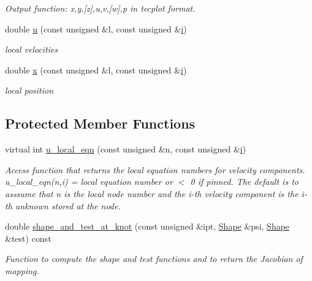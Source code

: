 \begin{DoxyCompactItemize}
\begin{DoxyCompactList}\small\item\em Output function\+: x,y,\mbox{[}z\mbox{]},u,v,\mbox{[}w\mbox{]},p in tecplot format. \end{DoxyCompactList}\item 
double \hyperlink{classoomph_1_1PolarStressIntegralElement_a2440239bc1944834403dc8a898c71672}{u} (const unsigned \&l, const unsigned \&\hyperlink{cfortran_8h_adb50e893b86b3e55e751a42eab3cba82}{i})
\begin{DoxyCompactList}\small\item\em local velocities \end{DoxyCompactList}\item 
double \hyperlink{classoomph_1_1PolarStressIntegralElement_accc1886b4e4d60b19046e11484e5d09d}{x} (const unsigned \&l, const unsigned \&\hyperlink{cfortran_8h_adb50e893b86b3e55e751a42eab3cba82}{i})
\begin{DoxyCompactList}\small\item\em local position \end{DoxyCompactList}\end{DoxyCompactItemize}
\subsection*{Protected Member Functions}
\begin{DoxyCompactItemize}
\item 
virtual int \hyperlink{classoomph_1_1PolarStressIntegralElement_adbf12bebeb0ffb79b5ab4157fa89a6a9}{u\+\_\+local\+\_\+eqn} (const unsigned \&n, const unsigned \&\hyperlink{cfortran_8h_adb50e893b86b3e55e751a42eab3cba82}{i})
\begin{DoxyCompactList}\small\item\em Access function that returns the local equation numbers for velocity components. u\+\_\+local\+\_\+eqn(n,i) = local equation number or $<$ 0 if pinned. The default is to asssume that n is the local node number and the i-\/th velocity component is the i-\/th unknown stored at the node. \end{DoxyCompactList}\item 
double \hyperlink{classoomph_1_1PolarStressIntegralElement_a3b78e948b5aec7e6397bb7f2770f6396}{shape\+\_\+and\+\_\+test\+\_\+at\+\_\+knot} (const unsigned \&ipt, \hyperlink{classoomph_1_1Shape}{Shape} \&psi, \hyperlink{classoomph_1_1Shape}{Shape} \&test) const
\begin{DoxyCompactList}\small\item\em Function to compute the shape and test functions and to return the Jacobian of mapping. \end{DoxyCompactList}\end{DoxyCompactItemize}
